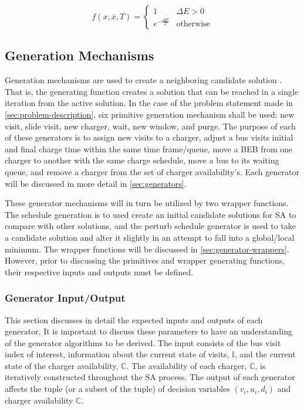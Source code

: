 \documentclass[11pt,a4paper,final]{article}
\newcommand{\I}{\mathbb{I}}                 %
\newcommand{\C}{\mathbb{C}}                 %
\begin{document}
\begin{equation}
\label{eq:candaccept}
f(x,\bar{x},T) =
\begin{cases}
  1                   & \Delta E > 0 \\
  e^{- \frac{\Delta E}{T}} & \text{otherwise}
\end{cases}
\end{equation}

\subsection{Generation Mechanisms}
\label{sec:generation-mechanisms}
Generation mechanisms are used to create a neighboring candidate solution \cite{gendreau-2018-handb-metah}. That is,
the generating function creates a solution that can be reached in a single iteration from the active solution. In the
case of the problem statement made in \ref{sec:problem-description}, six primitive generation mechanism shall be used: new
visit, slide visit, new charger, wait, new window, and purge. The purpose of each of these generators is to assign new
visits to a charger, adjust a bus visits initial and final charge time within the same time frame/queue, move a BEB from
one charger to another with the same charge schedule, move a bus to its waiting queue, and remove a charger from the set
of charger availability's. Each generator will be discussed in more detail in \ref{sec:generators}.

These generator mechanisms will in turn be utilized by two wrapper functions. The schedule generation is to used create
an initial candidate solutions for SA to compare with other solutions, and the perturb schedule generator is used to
take a candidate solution and alter it slightly in an attempt to fall into a global/local minimum. The wrapper functions
will be discussed in \ref{sec:generator-wrappers}. However, prior to discussing the primitives and wrapper generating
functions, their respective inputs and outputs must be defined.

\subsubsection{Generator Input/Output}
\label{sec:generator-input-output}
This section discusses in detail the expected inputs and outputs of each generator. It is important to discuss these
parameters to have an understanding of the generator algorithms to be derived. The input consists of the bus visit index
of interest, information about the current state of visits, \(\I\), and the current state of the charger availability,
\(\C\). The availability of each charger, \(\C\), is iteratively constructed throughout the SA process. The output of each
generator affects the tuple (or a subset of the tuple) of decision variables \((v_i, u_i, d_i)\) and charger availability
\(\C\).
\end{document}
